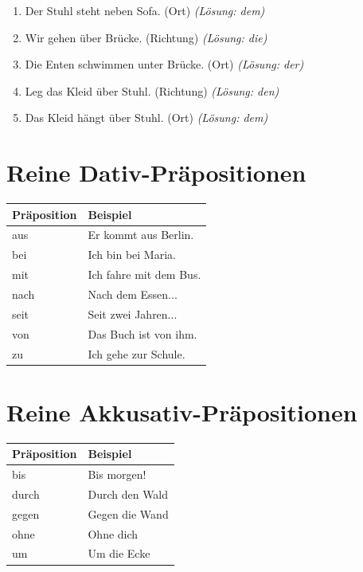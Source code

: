 \begin{enumerate}
    \item Der Stuhl steht neben \underline{\hspace{1cm}} Sofa. (Ort) \quad \textit{(Lösung: dem)}
    \item Wir gehen über \underline{\hspace{1cm}} Brücke. (Richtung) \quad \textit{(Lösung: die)}
    \item Die Enten schwimmen unter \underline{\hspace{1cm}} Brücke. (Ort) \quad \textit{(Lösung: der)}
    \item Leg das Kleid über \underline{\hspace{1cm}} Stuhl. (Richtung) \quad \textit{(Lösung: den)}
    \item Das Kleid hängt über \underline{\hspace{1cm}} Stuhl. (Ort) \quad \textit{(Lösung: dem)}
\end{enumerate}

\section{Reine Dativ-Präpositionen}
\label{sec:DativPraep}

\begin{center}
\begin{tabular}{|l|l|}
\hline
\textbf{Präposition} & \textbf{Beispiel} \\ \hline
aus & Er kommt aus Berlin. \\ \hline
bei & Ich bin bei Maria. \\ \hline
mit & Ich fahre mit dem Bus. \\ \hline
nach & Nach dem Essen... \\ \hline
seit & Seit zwei Jahren... \\ \hline
von & Das Buch ist von ihm. \\ \hline
zu & Ich gehe zur Schule. \\ \hline
\end{tabular}
\end{center}

\section{Reine Akkusativ-Präpositionen}
\label{sec:AkkusativPraep}

\begin{center}
\begin{tabular}{|l|l|}
\hline
\textbf{Präposition} & \textbf{Beispiel} \\ \hline
bis & Bis morgen! \\ \hline
durch & Durch den Wald \\ \hline
gegen & Gegen die Wand \\ \hline
ohne & Ohne dich \\ \hline
um & Um die Ecke \\ \hline
\end{tabular}
\end{center}

